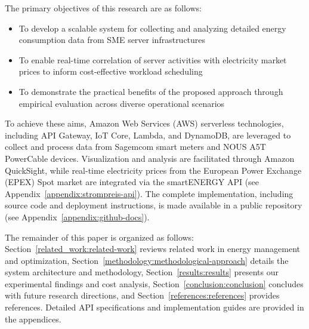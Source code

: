 The primary objectives of this research are as follows:
\begin{itemize}
\item To develop a scalable system for collecting and analyzing detailed energy consumption data from SME server infrastructures
\item To enable real-time correlation of server activities with electricity market prices to inform cost-effective workload scheduling
\item To demonstrate the practical benefits of the proposed approach through empirical evaluation across diverse operational scenarios
\end{itemize}

To achieve these aims, Amazon Web Services (AWS) serverless technologies, including API Gateway, IoT Core, Lambda, and DynamoDB, are leveraged to collect and process data from Sagemcom smart meters and NOUS A5T PowerCable devices. Visualization and analysis are facilitated through Amazon QuickSight, while real-time electricity prices from the European Power Exchange (EPEX) Spot market are integrated via the smartENERGY API (see Appendix~\ref{appendix:strompreis-api}). The complete implementation, including source code and deployment instructions, is made available in a public repository (see Appendix~\ref{appendix:github-docs}).

The remainder of this paper is organized as follows: Section~\ref{related_work:related-work} reviews related work in energy management and optimization, Section~\ref{methodology:methodological-approach} details the system architecture and methodology, Section~\ref{results:results} presents our experimental findings and cost analysis, Section~\ref{conclusion:conclusion} concludes with future research directions, and Section~\ref{references:references} provides references. Detailed API specifications and implementation guides are provided in the appendices.